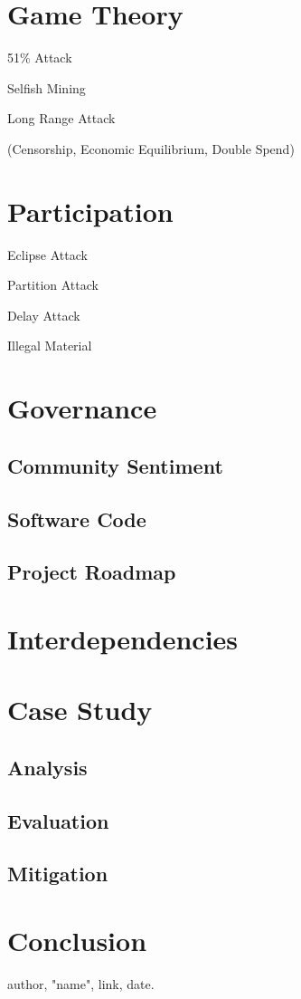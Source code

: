 \documentclass[11pt,a4paper,draft]{article}
\begin{document}
\section{Game Theory}

51\% Attack

Selfish Mining

Long Range Attack

(Censorship, Economic Equilibrium, Double Spend)


\section{Participation}

Eclipse Attack

Partition Attack

Delay Attack

Illegal Material

\section{Governance}

\subsection{Community Sentiment}

\subsection{Software Code}

\subsection{Project Roadmap}

\section{Interdependencies}

\section{Case Study}

\subsection{Analysis}

\subsection{Evaluation}

\subsection{Mitigation}

\section{Conclusion}

\cite{item}

\begin{thebibliography}{9}

author,
"name",
link,
date.

\end{thebibliography}
\end{document}
